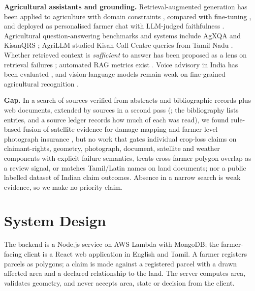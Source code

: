 \documentclass{ieeeaccess}
\begin{document}
\textbf{Agricultural assistants and grounding.} Retrieval-augmented generation \cite{lewis2020,gao2023} has been applied to agriculture with domain constraints \cite{ravindran2026}, compared with fine-tuning \cite{balaguer2024}, and deployed as personalised farmer chat with LLM-judged faithfulness \cite{singh2024}. Agricultural question-answering benchmarks and systems include AgXQA \cite{kpodo2024} and KisanQRS \cite{rehman2023}; AgriLLM studied Kisan Call Centre queries from Tamil Nadu \cite{didwania2024}. Whether retrieved context is \emph{sufficient} to answer has been proposed as a lens on retrieval failures \cite{joren2025}; automated RAG metrics exist \cite{es2024}. Voice advisory in India has been evaluated \cite{cole2021}, and vision-language models remain weak on fine-grained agricultural recognition \cite{shinoda2025}.

\textbf{Gap.} In a search of \GapFirstPassVerified{} sources verified from abstracts and bibliographic records plus \GapFirstPassWeb{} web documents, extended by \GapSecondPassAdded{} sources in a second pass (\LiteratureSearchDate{}; the bibliography lists \BibEntries{} entries, and a source ledger records how much of each was read), we found rule-based fusion of satellite evidence for damage mapping \cite{chakraborty2021} and farmer-level photograph insurance \cite{ceballos2019}, but no work that gates individual crop-loss claims on claimant-rights, geometry, photograph, document, satellite and weather components with explicit failure semantics, treats cross-farmer polygon overlap as a review signal, or matches Tamil/Latin names on land documents; nor a public labelled dataset of Indian claim outcomes. Absence in a narrow search is weak evidence, so we make no priority claim.

\section{System Design}
The backend is a Node.js service on AWS Lambda with MongoDB; the farmer-facing client is a React web application in English and Tamil. A farmer registers parcels as polygons; a claim is made against a registered parcel with a drawn affected area and a declared relationship to the land. The server computes area, validates geometry, and never accepts area, state or decision from the client.
\end{document}
